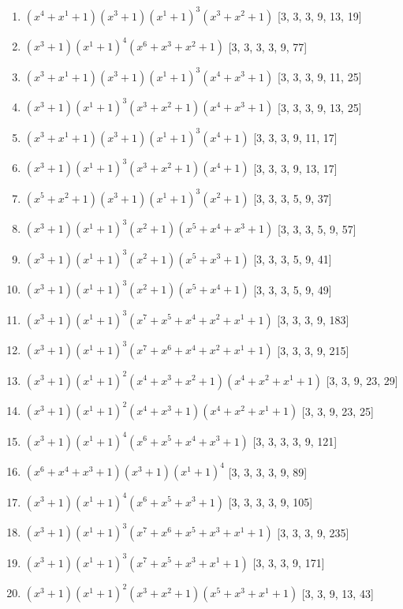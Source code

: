 \documentclass[10pt,twocolumn]{article}
\begin{document}
\begin{enumerate}
\item $(x^{4} + x^{1} + 1)(x^{3} + 1)(x^{1} + 1)^{3}(x^{3} + x^{2} + 1)$  [3, 3, 3, 9, 13, 19]
\item $(x^{3} + 1)(x^{1} + 1)^{4}(x^{6} + x^{3} + x^{2} + 1)$  [3, 3, 3, 3, 9, 77]
\item $(x^{3} + x^{1} + 1)(x^{3} + 1)(x^{1} + 1)^{3}(x^{4} + x^{3} + 1)$  [3, 3, 3, 9, 11, 25]
\item $(x^{3} + 1)(x^{1} + 1)^{3}(x^{3} + x^{2} + 1)(x^{4} + x^{3} + 1)$  [3, 3, 3, 9, 13, 25]
\item $(x^{3} + x^{1} + 1)(x^{3} + 1)(x^{1} + 1)^{3}(x^{4} + 1)$  [3, 3, 3, 9, 11, 17]
\item $(x^{3} + 1)(x^{1} + 1)^{3}(x^{3} + x^{2} + 1)(x^{4} + 1)$  [3, 3, 3, 9, 13, 17]
\item $(x^{5} + x^{2} + 1)(x^{3} + 1)(x^{1} + 1)^{3}(x^{2} + 1)$  [3, 3, 3, 5, 9, 37]
\item $(x^{3} + 1)(x^{1} + 1)^{3}(x^{2} + 1)(x^{5} + x^{4} + x^{3} + 1)$  [3, 3, 3, 5, 9, 57]
\item $(x^{3} + 1)(x^{1} + 1)^{3}(x^{2} + 1)(x^{5} + x^{3} + 1)$  [3, 3, 3, 5, 9, 41]
\item $(x^{3} + 1)(x^{1} + 1)^{3}(x^{2} + 1)(x^{5} + x^{4} + 1)$  [3, 3, 3, 5, 9, 49]
\item $(x^{3} + 1)(x^{1} + 1)^{3}(x^{7} + x^{5} + x^{4} + x^{2} + x^{1} + 1)$  [3, 3, 3, 9, 183]
\item $(x^{3} + 1)(x^{1} + 1)^{3}(x^{7} + x^{6} + x^{4} + x^{2} + x^{1} + 1)$  [3, 3, 3, 9, 215]
\item $(x^{3} + 1)(x^{1} + 1)^{2}(x^{4} + x^{3} + x^{2} + 1)(x^{4} + x^{2} + x^{1} + 1)$  [3, 3, 9, 23, 29]
\item $(x^{3} + 1)(x^{1} + 1)^{2}(x^{4} + x^{3} + 1)(x^{4} + x^{2} + x^{1} + 1)$  [3, 3, 9, 23, 25]
\item $(x^{3} + 1)(x^{1} + 1)^{4}(x^{6} + x^{5} + x^{4} + x^{3} + 1)$  [3, 3, 3, 3, 9, 121]
\item $(x^{6} + x^{4} + x^{3} + 1)(x^{3} + 1)(x^{1} + 1)^{4}$  [3, 3, 3, 3, 9, 89]
\item $(x^{3} + 1)(x^{1} + 1)^{4}(x^{6} + x^{5} + x^{3} + 1)$  [3, 3, 3, 3, 9, 105]
\item $(x^{3} + 1)(x^{1} + 1)^{3}(x^{7} + x^{6} + x^{5} + x^{3} + x^{1} + 1)$  [3, 3, 3, 9, 235]
\item $(x^{3} + 1)(x^{1} + 1)^{3}(x^{7} + x^{5} + x^{3} + x^{1} + 1)$  [3, 3, 3, 9, 171]
\item $(x^{3} + 1)(x^{1} + 1)^{2}(x^{3} + x^{2} + 1)(x^{5} + x^{3} + x^{1} + 1)$  [3, 3, 9, 13, 43]

\end{enumerate}
\end{document}
